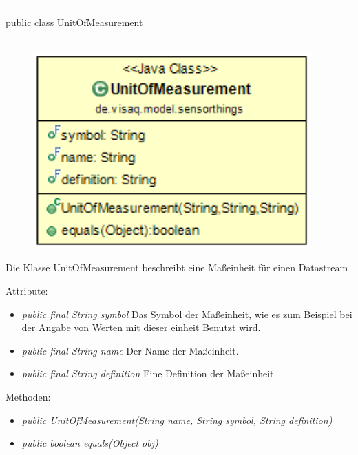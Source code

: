 \rule{\textwidth}{0.4pt}
public class UnitOfMeasurement
\\\\
\begin{minipage}{0.4\textwidth}
    \begin{figure}[H]
        {\centering\includegraphics[width=0.95\textwidth]{media/backend/modell/classes/UnitOfMeasurement.png}}
    \end{figure}
    \end{minipage} \hfill
\begin{minipage}{0.6\textwidth}
    Die Klasse UnitOfMeasurement beschreibt eine Maßeinheit für einen Datastream
\end{minipage}

Attribute:
\begin{itemize}
    \item \emph{public final String symbol} Das Symbol der Maßeinheit, wie es zum Beispiel bei der Angabe von Werten mit dieser einheit Benutzt wird.
    \item \emph{public final String name} Der Name der Maßeinheit.
    \item \emph{public final String definition} Eine Definition der Maßeinheit
\end{itemize}
Methoden:
\begin{itemize}
    \item \emph{public UnitOfMeasurement(String name, String symbol, String definition)}
    \item \emph{public boolean equals(Object obj)} 
\end{itemize}
